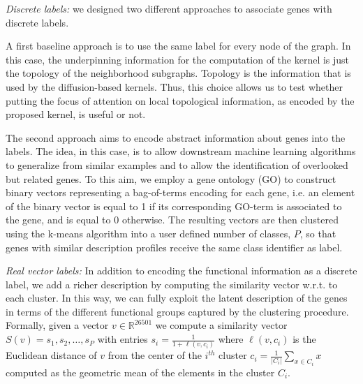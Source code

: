 \documentclass[review]{elsarticle}
\begin{document}
\textit{Discrete labels:} we designed two different approaches to associate genes with discrete labels.

A first baseline approach is to use the same label for every node of the graph. In this case, the underpinning information for the computation of the kernel is just the topology of the neighborhood subgraphs. Topology is the information that is used by the diffusion-based kernels. Thus, this choice allows us to test whether putting the focus of attention on local topological information, as encoded by the proposed kernel, is useful or not.

The second approach aims to encode abstract information about genes into the labels. The idea, in this case, is to allow  downstream machine learning algorithms to generalize from similar examples and to allow the identification of overlooked but related genes. To this aim, we employ a gene ontology (GO) \cite{gene2004gene} to construct binary vectors representing a bag-of-terms encoding for each gene, i.e. an element of the binary vector is equal to 1 if its corresponding GO-term is associated to the gene, and is equal to 0 otherwise. The resulting vectors are then clustered using the k-means algorithm into a user defined number of classes, $P$, so that genes with similar description profiles receive the same class identifier as label.

\textit{Real vector labels:} In addition to encoding the functional information as a discrete label, we add a richer description by computing the similarity vector w.r.t. to each cluster. In this way, we can fully exploit the latent description of the genes in terms of the different functional groups captured by the clustering procedure. Formally, given a vector $v \in \mathbb{R}^{26501}$ we compute a similarity vector $S(v)= {s_1, s_2, \ldots, s_P}$ with entries $s_i = \frac{1}{1+ \ell(v,c_i)}$ where $\ell(v,c_i)$ is the Euclidean distance of $v$ from the center of the $i^{th}$ cluster $c_i = \frac{1}{|C_i|}\sum_{x \in C_i} x$ computed as the geometric mean of the elements in the cluster $C_i$. 
\end{document}
